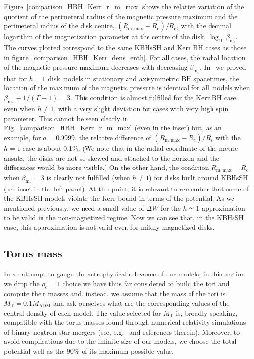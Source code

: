 \documentclass[twocolumn,aps,showpacs,showkeys,prd,superscriptaddress,byrevtex, amsmath]{revtex4-1}
\begin{document}
Figure~\ref{comparison_HBH_Kerr_r_m_max} shows the relative variation of the quotient of the perimeteral radius of the magnetic pressure maximum and the perimeteral radius of the disk centre, $(R_{\mathrm{m, max}}-R_{\mathrm{c}})/R_{\mathrm{c}}$, with the decimal logarithm of the magnetization parameter at the centre of the disk, $\log_{10} \beta_{\mathrm{m_c}}$. The curves plotted correspond to the same KBHsSH and Kerr BH cases as those in figure~\ref{comparison_HBH_Kerr_dens_enth}. For all cases, the radial location of the magnetic pressure maximum decreases with decreasing $\beta_{\mathrm{m_c}}$. In~\cite{Gimeno-Soler:2017} we proved that for $h=1$ disk models in stationary and axisymmetric BH spacetimes, the location of the maximum of the magnetic pressure is identical for all models when $\beta_{\mathrm{m_c}}\equiv 1 / (\Gamma - 1) = 3$. This condition is almost fulfilled for the Kerr BH case even when $h \neq 1$, with a very slight deviation for cases with very high spin parameter. This cannot be seen clearly in Fig.~\ref{comparison_HBH_Kerr_r_m_max} (even in the inset) but, as an example, for $a=0.9999$, the relative difference of $(R_{\mathrm{m, max}}-R_{\mathrm{c}})/R_{\mathrm{c}}$ with the $h=1$ case is about 0.1\%. (We note that in the radial coordinate of the metric ansatz, the disks are not so skewed and attached to the horizon and the differences would be more visible.) On the other hand, the condition $R_{\mathrm{m, max}}=R_{\mathrm{c}}$ when $\beta_{\mathrm{m_c}}= 3$ is clearly not fulfilled (when $h \neq 1$) for disks built around KBHsSH (see inset in the left panel). At this point, it is relevant to remember that some of the KBHsSH models violate the Kerr bound in terms of the potential. As we mentioned previously, we need a small value of $\Delta W$ for the $h \simeq 1$ approximation to be valid in the non-magnetized regime. Now we can see that, in the KBHsSH case, this approximation is not valid even for mildly-magnetized disks.

\subsection{Torus mass}

In an attempt to gauge the astrophysical relevance of our models, in this section we drop the $\rho_{\mathrm{c}} = 1$ choice we have thus far considered to build the tori and compute their masses and, instead, we assume that the mass of the tori is $M_{\mathrm{T}} = 0.1 M_{\mathrm{ADM}}$ and ask ourselves what are the corresponding values of the central density of each model. The value selected for $M_{\mathrm{T}}$ is, broadly speaking, compatible with the torus masses found through numerical relativity simulations of binary neutron star mergers (see, e.g.~\cite{Rezzolla:2010, Rezzolla:2017} and references therein). Moreover, to avoid complications due to the infinite size of our models, we choose the total potential well as the $90\%$ of its maximum possible value.
\end{document}
